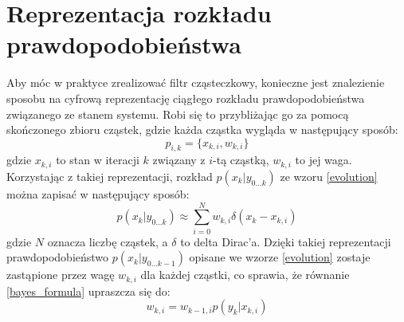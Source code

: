 \section{Reprezentacja rozkładu prawdopodobieństwa}
Aby móc w praktyce zrealizować filtr cząsteczkowy, konieczne jest znalezienie sposobu na cyfrową reprezentację ciągłego rozkładu prawdopodobieństwa związanego ze stanem systemu. Robi się to przybliżając go za pomocą skończonego zbioru cząstek, gdzie każda cząstka wygląda w następujący sposób:
\begin{equation*}
	p_{i,k}=\{x_{k,i},w_{k,i}\}
\end{equation*}
gdzie $x_{k,i}$ to stan w iteracji $k$ związany z $i$-tą cząstką, $w_{k,i}$ to jej waga. Korzystając z takiej reprezentacji, rozkład $p(x_k|y_{0...k})$ ze wzoru \ref{evolution} można zapisać w następujący sposób:
\begin{equation}
	p(x_k|y_{0...k})\approx \sum_{i=0}^{N} w_{k,i}	\delta(x_k-x_{k,i})
\end{equation}
gdzie $N$ oznacza liczbę cząstek, a $\delta$ to delta Dirac'a. Dzięki takiej reprezentacji prawdopodobieństwo $p(x_k|y_{0...k-1})$ opisane we wzorze \ref{evolution} zostaje zastąpione przez wagę $w_{k,i}$ dla każdej cząstki, co sprawia, że równanie \ref{bayes_formula} upraszcza się do:
\begin{equation}\label{weight_update}
	w_{k,i} = w_{k-1,i} p(y_k|x_{k,i})
\end{equation}


